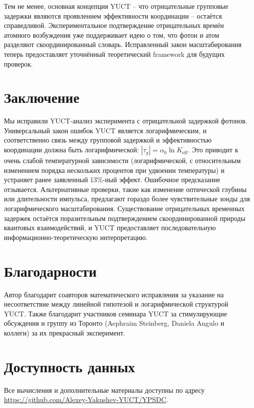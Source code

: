 \documentclass[12pt,a4paper]{article}
\newcommand{\Keff}{K_{\mathrm{eff}}}
\begin{document}
	Тем не менее, основная концепция YUCT – что отрицательные групповые задержки являются проявлением эффективности координации – остаётся справедливой. Экспериментальное подтверждение отрицательных времён атомного возбуждения уже поддерживает идею о том, что фотон и атом разделяют скоординированный словарь. Исправленный закон масштабирования теперь предоставляет уточнённый теоретический framework для будущих проверок.
	
	\section{Заключение}
	
	Мы исправили YUCT-анализ эксперимента с отрицательной задержкой фотонов. Универсальный закон ошибок YUCT является логарифмическим, и соответственно связь между групповой задержкой и эффективностью координации должна быть логарифмической: \(|\tau_g| = \alpha_0 \ln\Keff\). Это приводит к очень слабой температурной зависимости (логарифмической, с относительным изменением порядка нескольких процентов при удвоении температуры) и устраняет ранее заявленный 13\%-ный эффект. Ошибочное предсказание отзывается. Альтернативные проверки, такие как изменение оптической глубины или длительности импульса, предлагают гораздо более чувствительные зонды для логарифмического масштабирования. Существование отрицательных временных задержек остаётся поразительным подтверждением скоординированной природы квантовых взаимодействий, и YUCT предоставляет последовательную информационно-теоретическую интерпретацию.
	
	\section*{Благодарности}
	
	Автор благодарит соавторов математического исправления за указание на несоответствие между линейной гипотезой и логарифмической структурой YUCT. Также благодарит участников семинара YUCT за стимулирующие обсуждения и группу из Торонто (Aephraim Steinberg, Daniela Angulo и коллеги) за их прекрасный эксперимент.
	
	\section*{Доступность данных}
	
	Все вычисления и дополнительные материалы доступны по адресу \url{https://github.com/Alexey-Yakushev-YUCT/YPSDC}.
	
\end{document}

